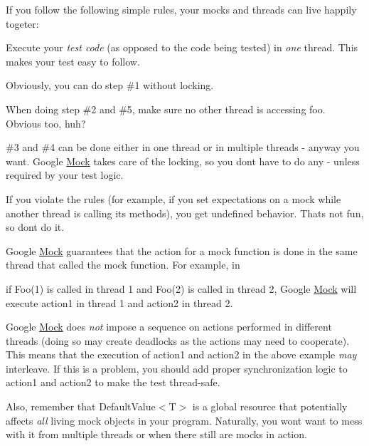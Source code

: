 If you follow the following simple rules, your mocks and threads can live happily togeter\+:


\begin{DoxyItemize}
\item Execute your {\itshape test code} (as opposed to the code being tested) in {\itshape one} thread. This makes your test easy to follow.
\item Obviously, you can do step \#1 without locking.
\item When doing step \#2 and \#5, make sure no other thread is accessing {\ttfamily foo}. Obvious too, huh?
\item \#3 and \#4 can be done either in one thread or in multiple threads -\/ anyway you want. Google \mbox{\hyperlink{class_mock}{Mock}} takes care of the locking, so you don\textquotesingle{}t have to do any -\/ unless required by your test logic.
\end{DoxyItemize}

If you violate the rules (for example, if you set expectations on a mock while another thread is calling its methods), you get undefined behavior. That\textquotesingle{}s not fun, so don\textquotesingle{}t do it.

Google \mbox{\hyperlink{class_mock}{Mock}} guarantees that the action for a mock function is done in the same thread that called the mock function. For example, in


\begin{DoxyCode}{0}
\end{DoxyCode}


if {\ttfamily Foo(1)} is called in thread 1 and {\ttfamily Foo(2)} is called in thread 2, Google \mbox{\hyperlink{class_mock}{Mock}} will execute {\ttfamily action1} in thread 1 and {\ttfamily action2} in thread 2.

Google \mbox{\hyperlink{class_mock}{Mock}} does {\itshape not} impose a sequence on actions performed in different threads (doing so may create deadlocks as the actions may need to cooperate). This means that the execution of {\ttfamily action1} and {\ttfamily action2} in the above example {\itshape may} interleave. If this is a problem, you should add proper synchronization logic to {\ttfamily action1} and {\ttfamily action2} to make the test thread-\/safe.

Also, remember that {\ttfamily Default\+Value$<$T$>$} is a global resource that potentially affects {\itshape all} living mock objects in your program. Naturally, you won\textquotesingle{}t want to mess with it from multiple threads or when there still are mocks in action.

